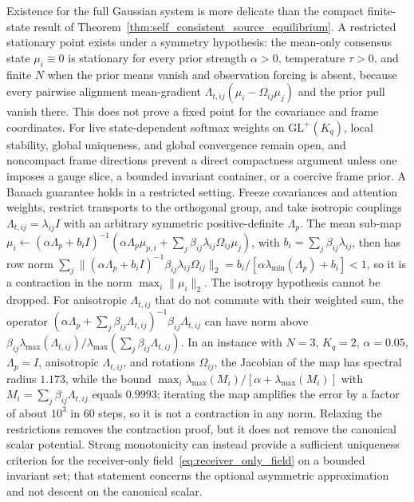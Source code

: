 Existence for the full Gaussian system is more delicate than the compact finite-state result of Theorem~\ref{thm:self_consistent_source_equilibrium}. A restricted stationary point exists under a symmetry hypothesis: the mean-only consensus state $\mu_i \equiv 0$ is stationary for every prior strength $\alpha>0$, temperature $\tau>0$, and finite $N$ when the prior means vanish and observation forcing is absent, because every pairwise alignment mean-gradient $\Lambda_{t,ij}(\mu_i-\Omega_{ij}\mu_j)$ and the prior pull vanish there. This does not prove a fixed point for the covariance and frame coordinates. For live state-dependent softmax weights on $\mathrm{GL}^+(K_q)$, local stability, global uniqueness, and global convergence remain open, and noncompact frame directions prevent a direct compactness argument unless one imposes a gauge slice, a bounded invariant container, or a coercive frame prior. A Banach guarantee holds in a restricted setting. Freeze covariances and attention weights, restrict transports to the orthogonal group, and take isotropic couplings $\Lambda_{t,ij}=\lambda_{ij}I$ with an arbitrary symmetric positive-definite $\Lambda_p$. The mean sub-map $\mu_i\leftarrow(\alpha\Lambda_p+b_iI)^{-1}(\alpha\Lambda_p\mu_{p,i}+\sum_j\beta_{ij}\lambda_{ij}\Omega_{ij}\mu_j)$, with $b_i=\sum_j\beta_{ij}\lambda_{ij}$, then has row norm $\sum_j\|(\alpha\Lambda_p+b_iI)^{-1}\beta_{ij}\lambda_{ij}\Omega_{ij}\|_2=b_i/[\alpha\lambda_{\min}(\Lambda_p)+b_i]<1$, so it is a contraction in the norm $\max_i\|\mu_i\|_2$. The isotropy hypothesis cannot be dropped. For anisotropic $\Lambda_{t,ij}$ that do not commute with their weighted sum, the operator $(\alpha\Lambda_p+\sum_j\beta_{ij}\Lambda_{t,ij})^{-1}\beta_{ij}\Lambda_{t,ij}$ can have norm above $\beta_{ij}\lambda_{\max}(\Lambda_{t,ij})/\lambda_{\max}(\sum_j\beta_{ij}\Lambda_{t,ij})$. In an instance with $N=3$, $K_q=2$, $\alpha=0.05$, $\Lambda_p=I$, anisotropic $\Lambda_{t,ij}$, and rotations $\Omega_{ij}$, the Jacobian of the map has spectral radius $1.173$, while the bound $\max_i\lambda_{\max}(M_i)/[\alpha+\lambda_{\max}(M_i)]$ with $M_i=\sum_j\beta_{ij}\Lambda_{t,ij}$ equals $0.9993$; iterating the map amplifies the error by a factor of about $10^3$ in $60$ steps, so it is not a contraction in any norm. Relaxing the restrictions removes the contraction proof, but it does not remove the canonical scalar potential. Strong monotonicity can instead provide a sufficient uniqueness criterion for the receiver-only field~\eqref{eq:receiver_only_field} on a bounded invariant set; that statement concerns the optional asymmetric approximation and not descent on the canonical scalar.

